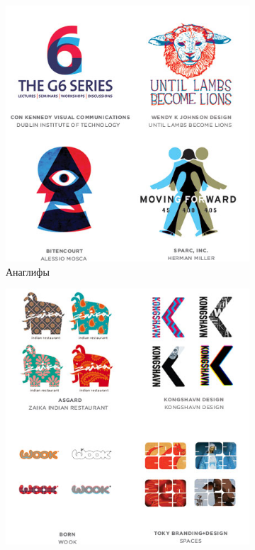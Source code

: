 \begin{figure}[h!]
\begin{subfigure}{.45\textwidth}
    \includegraphics[width=\linewidth]{images/supplement/logolounge/2012/Anaglifi}
    \caption[]{Анаглифы}
    \label{fig:logolounge:2012:anaglifi}
  \end{subfigure}
  \vfill
  \centering
  \begin{subfigure}{.45\textwidth}
    \centering
    \includegraphics[width=\linewidth]{images/supplement/logolounge/2012/Bratskie-serii.jpeg}

\end{subfigure}
\end{figure}
